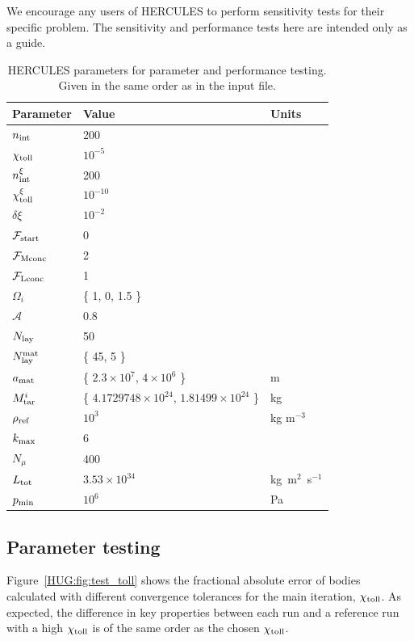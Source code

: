 \documentclass[11pt, oneside]{article}   	%
\begin{document}
We encourage any users of HERCULES to perform sensitivity tests for their specific problem. The sensitivity and performance tests here are intended only as a guide. 


{\renewcommand{\arraystretch}{1.3}
\begin{table}
\centering
\caption{HERCULES parameters for parameter and performance testing. Given in the same order as in the input file.}
\vspace{1 cm}
\begin{tabular}{l | l | l}
\label{HUG:tab:ref_params}
Parameter & Value & Units \\ \hline
$n_{\rm int}$ & 200 & \\ 
$\chi_{\rm toll}$ & $10^{-5}$ & \\
$n_{\rm int}^{\xi}$ & 200 & \\
$\chi_{\rm toll}^{\xi}$ & $10^{-10}$ & \\
$\delta \xi $ & $10^{-2}$ & \\
$\mathcal{F}_{\rm start}$ & 0 & \\
$\mathcal{F}_{\rm Mconc}$ & 2 & \\
$\mathcal{F}_{\rm Lconc}$ & 1 & \\
$\Omega_i$ & \{ 1, 0, 1.5 \} & \\
$\mathcal{A}$ & 0.8 & \\
$N_{\rm lay}$ & 50 & \\
$N_{\rm lay}^{\rm mat}$ & \{ 45, 5 \} & \\
$a_{\rm mat}$ & \{ $2.3\times10^7$, $4\times10^6$ \} & m \\ 
$M_{\rm tar}^i$ & \{ $4.1729748\times 10^{24}$, $1.81499\times 10^{24}$ \} & kg \\
$\rho_{\rm ref}$ & $10^3$ & kg m$^{-3}$\\
$k_{\rm max}$ & 6 & \\
$N_{\mu}$ & 400 & \\
$L_{\rm tot}$ & $3.53 \times 10^{34}$ &  kg~m$^2$~s$^{-1}$ \\
$p_{\rm min}$ & $10^6$ & Pa
\end{tabular}
\end{table}
}
\FloatBarrier


\subsection{Parameter testing}

Figure~\ref{HUG:fig:test_toll} shows the fractional absolute error of bodies calculated with different convergence tolerances for the main iteration, $\chi_{\rm toll}$. As expected, the difference in key properties between each run and a reference run with a high $\chi_{\rm toll}$ is of the same order as the chosen $\chi_{\rm toll}$.
\end{document}
